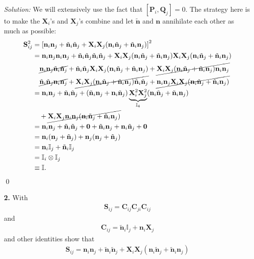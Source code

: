 \documentclass{book}
\theoremstyle{definition}
\newcommand{\nn}{\nonumber}
\newcommand{\n}{\mathbf{n}}
\newcommand{\X}{\mathbf{X}}
\newcommand{\lb}{\left[}
\newcommand{\rb}{\right]}
\newcommand{\Id}{\mathbb{I}}
\begin{document}
\noindent \textit{Solution:} We will extensively use the fact that $[\mathbf{P}_i,\mathbf{Q}_j] = 0$. The strategy here is to make the $\X_i$'s and $\X_j$'s combine and let $\tilde{\n}$ and $\n$ annihilate each other as much as possible:
\begin{align}
\mathbf{S}_{ij}^2 &= \lb \n_i\n_j + \tilde{\mathbf{\n}}_i \tilde{\mathbf{\n}}_j + \X_i\X_j(\n_i\tilde{\mathbf{n}}_j + \tilde{\mathbf{n}}_i \n_j) \rb^2\nn\\
&= \n_i\n_j\n_i\n_j + \tilde{\mathbf{\n}}_i \tilde{\mathbf{\n}}_j\tilde{\mathbf{\n}}_i \tilde{\mathbf{\n}}_j + \X_i\X_j(\n_i\tilde{\mathbf{n}}_j + \tilde{\mathbf{n}}_i \n_j)\X_i\X_j(\n_i\tilde{\mathbf{n}}_j + \tilde{\mathbf{n}}_i \n_j) \nn\\
&\quad \cancel{\n_i\n_j\tilde{\mathbf{\n}}_i \tilde{\mathbf{\n}}_j} + {\tilde{\mathbf{\n}}_i \tilde{\mathbf{\n}}_j\X_i\X_j(\n_i\tilde{\mathbf{n}}_j + \tilde{\mathbf{n}}_i \n_j)} + \cancel{\X_i\X_j(\n_i\tilde{\mathbf{n}}_j + \tilde{\mathbf{n}}_i \n_j)\n_i\n_j} \nn\\
&\quad \cancel{\tilde{\mathbf{\n}}_i \tilde{\mathbf{\n}}_j\n_i\n_j} + \cancel{\X_i\X_j(\n_i\tilde{\mathbf{n}}_j + \tilde{\mathbf{n}}_i \n_j)\tilde{\mathbf{\n}}_i \tilde{\mathbf{\n}}_j} + \cancel{\n_i\n_j\X_i\X_j(\n_i\tilde{\mathbf{n}}_j + \tilde{\mathbf{n}}_i \n_j)}\nn\\
&= \n_i \n_j + \tilde{\n}_i\tilde{\n}_j +  (\tilde{\n}_i\n_j+\n_i\tilde{\n}_j)\underbrace{\X_i^2\X_j^2}_{\Id_4}(\n_i\tilde{\n}_j+\tilde{\n}_i\n_j) \nn\\ &\quad +\cancel{\X_i\X_j\n_i\n_j(\n_i\tilde{\mathbf{n}}_j + \tilde{\mathbf{n}}_i \n_j)}\nn\\
&= \n_i \n_j + \tilde{\n}_i\tilde{\n}_j + \mathbf{0} + \tilde{\n}_i\n_j + \n_i\tilde{\n}_j + \mathbf{0}\nn\\
&= \n_i(\n_j+ \tilde{\n}_j) + \n_j(\n_j + \tilde{\n}_j)\nn\\
&= \n_i\Id_j + \tilde{\n}_i \Id_j \nn\\
&= \Id_i \otimes \Id_j \nn\\
&\equiv \Id.
\end{align}
\qed



\newpage





\noindent \textbf{2.} With
\begin{align}
\mathbf{S}_{ij} = \mathbf{C}_{ij}\mathbf{C}_{ji}\mathbf{C}_{ij}
\end{align}
and 
\begin{align}
\mathbf{C}_{ij} = \tilde{\n}_i\Id_j + \n_i \X_j
\end{align}
and other identities show that
\begin{align}
\mathbf{S}_{ij} = \n_i\n_j + \tilde{\mathbf{\n}}_i \tilde{\mathbf{\n}}_j + \X_i\X_j(\n_i\tilde{\mathbf{n}}_j + \tilde{\mathbf{n}}_i \n_j)
\end{align}
\end{document}
